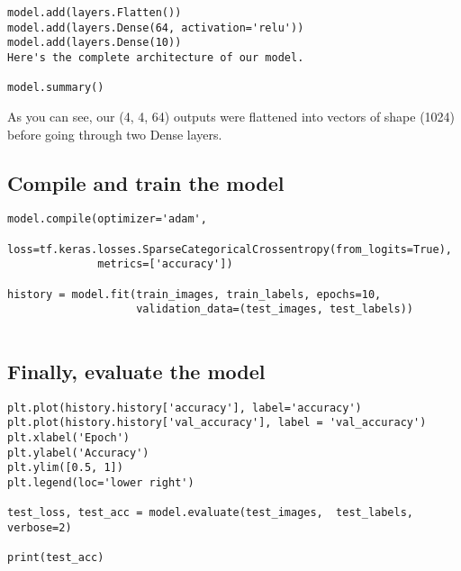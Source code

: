 \documentclass[%
oneside,                 %
final,                   %
10pt]{article}
\begin{document}
\begin{verbatim}
model.add(layers.Flatten())
model.add(layers.Dense(64, activation='relu'))
model.add(layers.Dense(10))
Here's the complete architecture of our model.

model.summary()

\end{verbatim}

As you can see, our (4, 4, 64) outputs were flattened into vectors of shape (1024) before going through two Dense layers.

\subsection*{Compile and train the model}









\begin{verbatim}
model.compile(optimizer='adam',
              loss=tf.keras.losses.SparseCategoricalCrossentropy(from_logits=True),
              metrics=['accuracy'])
​
history = model.fit(train_images, train_labels, epochs=10, 
                    validation_data=(test_images, test_labels))


\end{verbatim}


\subsection*{Finally, evaluate the model}













\begin{verbatim}
plt.plot(history.history['accuracy'], label='accuracy')
plt.plot(history.history['val_accuracy'], label = 'val_accuracy')
plt.xlabel('Epoch')
plt.ylabel('Accuracy')
plt.ylim([0.5, 1])
plt.legend(loc='lower right')

test_loss, test_acc = model.evaluate(test_images,  test_labels, verbose=2)

print(test_acc)


\end{verbatim}



\end{document}
